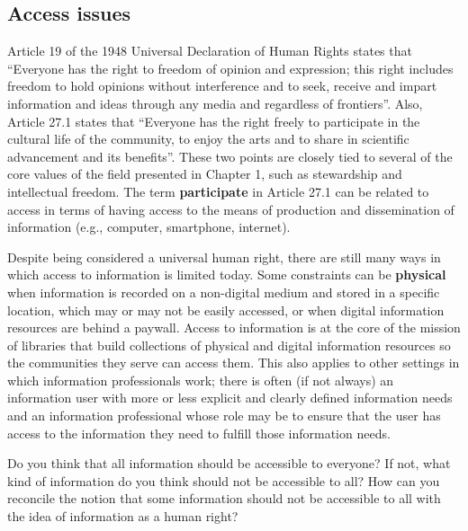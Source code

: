 \documentclass[
  letterpaper,
  DIV=11,
  numbers=noendperiod]{scrreprt}
\begin{document}
\subsection{Access issues}\label{access-issues}

Article 19 of the 1948 Universal Declaration of Human Rights states that
``Everyone has the right to freedom of opinion and expression; this
right includes freedom to hold opinions without interference and to
seek, receive and impart information and ideas through any media and
regardless of frontiers''. Also, Article 27.1 states that ``Everyone has
the right freely to participate in the cultural life of the community,
to enjoy the arts and to share in scientific advancement and its
benefits''. These two points are closely tied to several of the core
values of the field presented in Chapter 1, such as stewardship and
intellectual freedom. The term \textbf{participate} in Article 27.1 can
be related to access in terms of having access to the means of
production and dissemination of information (e.g., computer, smartphone,
internet).

Despite being considered a universal human right, there are still many
ways in which access to information is limited today. Some constraints
can be \textbf{physical} when information is recorded on a non-digital
medium and stored in a specific location, which may or may not be easily
accessed, or when digital information resources are behind a paywall.
Access to information is at the core of the mission of libraries that
build collections of physical and digital information resources so the
communities they serve can access them. This also applies to other
settings in which information professionals work; there is often (if not
always) an information user with more or less explicit and clearly
defined information needs and an information professional whose role may
be to ensure that the user has access to the information they need to
fulfill those information needs.

\begin{tcolorbox}[enhanced jigsaw, arc=.35mm, bottomrule=.15mm, bottomtitle=1mm, breakable, colback=white, colbacktitle=quarto-callout-tip-color!10!white, colframe=quarto-callout-tip-color-frame, coltitle=black, left=2mm, leftrule=.75mm, opacityback=0, opacitybacktitle=0.6, rightrule=.15mm, title=\textcolor{quarto-callout-tip-color}{\faLightbulb}\hspace{0.5em}{Pause and reflect}, titlerule=0mm, toprule=.15mm, toptitle=1mm]

Do you think that all information should be accessible to everyone? If
not, what kind of information do you think should not be accessible to
all? How can you reconcile the notion that some information should not
be accessible to all with the idea of information as a human right?

\end{tcolorbox}
\end{document}
